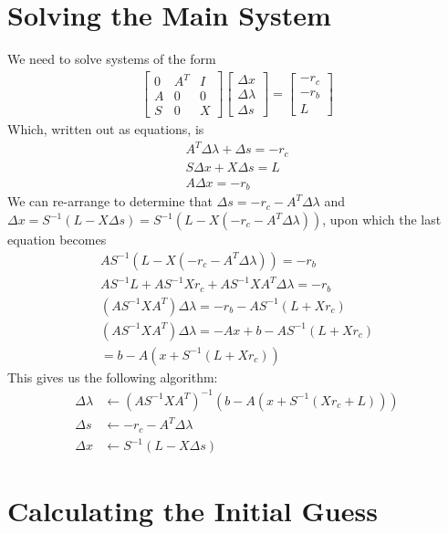 \documentclass{article}
\begin{document}
\section{Solving the Main System}

We need to solve systems of the form
\begin{align}
		\begin{bmatrix}
				0 & A^T & I\\
				A & 0   & 0\\
				S & 0   & X
		\end{bmatrix}
		\begin{bmatrix}
				\Delta x\\
				\Delta \lambda\\
				\Delta s
		\end{bmatrix} 
		= 
		\begin{bmatrix}
				-r_c\\
				-r_b\\
				L
		\end{bmatrix}
\end{align}
Which, written out as equations, is
\begin{align}
		A^T\Delta \lambda + \Delta s = -r_c\\
		S\Delta x + X\Delta s = L\\
		A\Delta x = -r_b
\end{align}
We can re-arrange to determine that $\Delta s = -r_c - A^T\Delta \lambda$ and $\Delta x = S^{-1}(L - X\Delta s) = S^{-1}(L - X(-r_c - A^T\Delta \lambda))$, upon which the last equation becomes
\begin{align}
		AS^{-1}(L - X(-r_c - A^T\Delta \lambda)) = -r_b\\
		AS^{-1}L + AS^{-1}Xr_c + AS^{-1}XA^T\Delta \lambda = -r_b\\
		(AS^{-1}XA^T) \Delta \lambda = -r_b - AS^{-1}(L + Xr_c)\\
		(AS^{-1}XA^T) \Delta \lambda = -Ax + b - AS^{-1}(L + Xr_c)\\
		= b - A(x + S^{-1}(L + Xr_c))
\end{align}
This gives us the following algorithm:
\begin{align}
	\Delta \lambda &\leftarrow (AS^{-1}XA^T)^{-1}(b-A(x + S^{-1}(Xr_c + L)))\\
	\Delta s &\leftarrow -r_c - A^T\Delta \lambda\\
	\Delta x &\leftarrow S^{-1}(L - X\Delta s)
\end{align}

\section{Calculating the Initial Guess}
\end{document}
